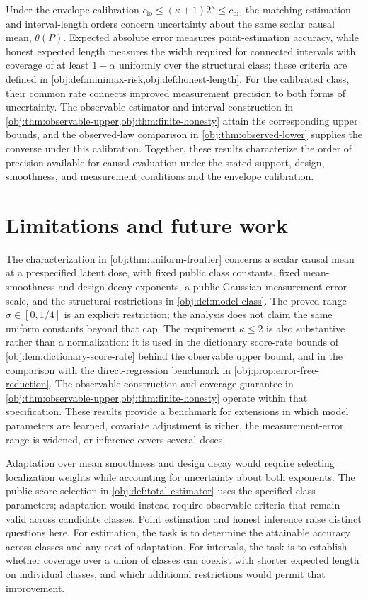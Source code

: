\documentclass[11pt]{article}
\begin{document}
Under the envelope calibration \(c_{\mathrm{lo}}\le(\kappa+1)2^\kappa\le c_{\mathrm{hi}}\), the matching estimation and interval-length orders concern uncertainty about the same scalar causal mean, \(\theta(P)\). Expected absolute error measures point-estimation accuracy, while honest expected length measures the width required for connected intervals with coverage of at least \(1-\alpha\) uniformly over the structural class; these criteria are defined in \cref{obj:def:minimax-risk,obj:def:honest-length}. For the calibrated class, their common rate connects improved measurement precision to both forms of uncertainty. The observable estimator and interval construction in \cref{obj:thm:observable-upper,obj:thm:finite-honesty} attain the corresponding upper bounds, and the observed-law comparison in \cref{obj:thm:observed-lower} supplies the converse under this calibration. Together, these results characterize the order of precision available for causal evaluation under the stated support, design, smoothness, and measurement conditions and the envelope calibration.


\section{Limitations and future work}

The characterization in \cref{obj:thm:uniform-frontier} concerns a scalar causal mean at a prespecified latent dose, with fixed public class constants, fixed mean-smoothness and design-decay exponents, a public Gaussian measurement-error scale, and the structural restrictions in \cref{obj:def:model-class}. The proved range \(\sigma\in[0,1/4]\) is an explicit restriction; the analysis does not claim the same uniform constants beyond that cap. The requirement \(\kappa\le2\) is also substantive rather than a normalization: it is used in the dictionary score-rate bounds of \cref{obj:lem:dictionary-score-rate} behind the observable upper bound, and in the comparison with the direct-regression benchmark in \cref{obj:prop:error-free-reduction}. The observable construction and coverage guarantee in \cref{obj:thm:observable-upper,obj:thm:finite-honesty} operate within that specification. These results provide a benchmark for extensions in which model parameters are learned, covariate adjustment is richer, the measurement-error range is widened, or inference covers several doses.

Adaptation over mean smoothness and design decay would require selecting localization weights while accounting for uncertainty about both exponents. The public-score selection in \cref{obj:def:total-estimator} uses the specified class parameters; adaptation would instead require observable criteria that remain valid across candidate classes. Point estimation and honest inference raise distinct questions here. For estimation, the task is to determine the attainable accuracy across classes and any cost of adaptation. For intervals, the task is to establish whether coverage over a union of classes can coexist with shorter expected length on individual classes, and which additional restrictions would permit that improvement.
\end{document}

